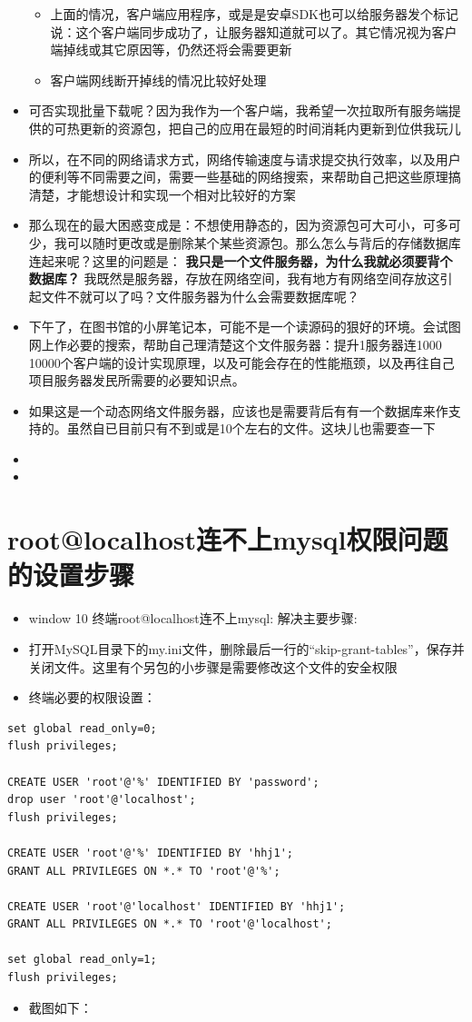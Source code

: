 \documentclass[9pt, b5paper]{article}
\begin{document}
\begin{itemize}
\begin{itemize}
\item 上面的情况，客户端应用程序，或是是安卓SDK也可以给服务器发个标记说：这个客户端同步成功了，让服务器知道就可以了。其它情况视为客户端掉线或其它原因等，仍然还将会需要更新
\item 客户端网线断开掉线的情况比较好处理
\end{itemize}
\item 可否实现批量下载呢？因为我作为一个客户端，我希望一次拉取所有服务端提供的可热更新的资源包，把自己的应用在最短的时间消耗内更新到位供我玩儿
\item 所以，在不同的网络请求方式，网络传输速度与请求提交执行效率，以及用户的便利等不同需要之间，需要一些基础的网络搜索，来帮助自己把这些原理搞清楚，才能想设计和实现一个相对比较好的方案
\item 那么现在的最大困惑变成是：不想使用静态的，因为资源包可大可小，可多可少，我可以随时更改或是删除某个某些资源包。那么怎么与背后的存储数据库连起来呢？这里的问题是： \textbf{我只是一个文件服务器，为什么我就必须要背个数据库？} 我既然是服务器，存放在网络空间，我有地方有网络空间存放这引起文件不就可以了吗？文件服务器为什么会需要数据库呢？
\item 下午了，在图书馆的小屏笔记本，可能不是一个读源码的狠好的环境。会试图网上作必要的搜索，帮助自己理清楚这个文件服务器：提升1服务器连1000 10000个客户端的设计实现原理，以及可能会存在的性能瓶颈，以及再往自己项目服务器发民所需要的必要知识点。
\item 如果这是一个动态网络文件服务器，应该也是需要背后有有一个数据库来作支持的。虽然自已目前只有不到或是10个左右的文件。这块儿也需要查一下
\item 
\item 
\end{itemize}
\section{root@localhost连不上mysql权限问题的设置步骤}
\label{sec-9}
\begin{itemize}
\item window 10 终端root@localhost连不上mysql: 解决主要步骤:
\item 打开MySQL目录下的my.ini文件，删除最后一行的“skip-grant-tables”，保存并关闭文件。这里有个另包的小步骤是需要修改这个文件的安全权限
\item 终端必要的权限设置：
\end{itemize}
\begin{verbatim}
set global read_only=0;
flush privileges;

CREATE USER 'root'@'%' IDENTIFIED BY 'password';
drop user 'root'@'localhost';
flush privileges;

CREATE USER 'root'@'%' IDENTIFIED BY 'hhj1';
GRANT ALL PRIVILEGES ON *.* TO 'root'@'%';

CREATE USER 'root'@'localhost' IDENTIFIED BY 'hhj1';
GRANT ALL PRIVILEGES ON *.* TO 'root'@'localhost';

set global read_only=1;
flush privileges;
\end{verbatim}
\begin{itemize}
\item 截图如下：
\end{itemize}
\end{document}
